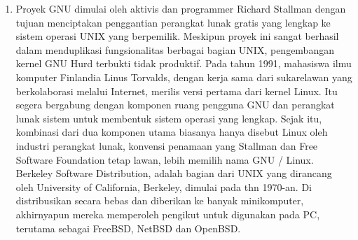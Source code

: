 \begin{enumerate}
		\item Proyek GNU dimulai oleh aktivis dan programmer Richard Stallman dengan tujuan menciptakan penggantian perangkat lunak gratis yang lengkap ke sistem operasi UNIX yang berpemilik. Meskipun proyek ini sangat berhasil dalam menduplikasi fungsionalitas berbagai bagian UNIX, pengembangan kernel GNU Hurd terbukti tidak produktif. Pada tahun 1991, mahasiswa ilmu komputer Finlandia Linus Torvalds, dengan kerja sama dari sukarelawan yang berkolaborasi melalui Internet, merilis versi pertama dari kernel Linux. Itu segera bergabung dengan komponen ruang pengguna GNU dan perangkat lunak sistem untuk membentuk sistem operasi yang lengkap. Sejak itu, kombinasi dari dua komponen utama biasanya hanya disebut Linux oleh industri perangkat lunak, konvensi penamaan yang Stallman dan Free Software Foundation tetap lawan, lebih memilih nama GNU / Linux. Berkeley Software Distribution, adalah bagian dari UNIX yang dirancang oleh University of California, Berkeley, dimulai pada thn 1970-an. Di distribusikan secara bebas dan diberikan ke banyak minikomputer, akhirnyapun mereka  memperoleh pengikut untuk digunakan pada PC, terutama sebagai FreeBSD, NetBSD dan OpenBSD.
	\end{enumerate}
